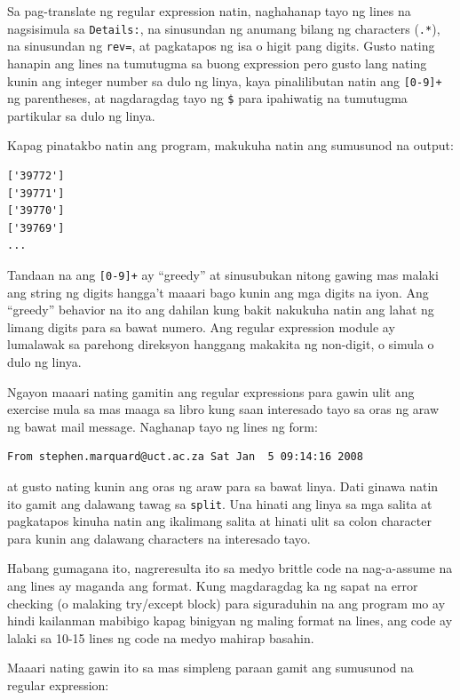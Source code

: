 \documentclass[10pt,]{book}
\begin{document}
Sa pag-translate ng regular expression natin, naghahanap tayo ng lines
na nagsisimula sa \texttt{Details:}, na sinusundan ng anumang bilang ng
characters (\texttt{.*}), na sinusundan ng \texttt{rev=}, at pagkatapos
ng isa o higit pang digits. Gusto nating hanapin ang lines na tumutugma
sa buong expression pero gusto lang nating kunin ang integer number sa
dulo ng linya, kaya pinalilibutan natin ang \texttt{{[}0-9{]}+} ng
parentheses, at nagdaragdag tayo ng \texttt{\$} para ipahiwatig na
tumutugma partikular sa dulo ng linya.

Kapag pinatakbo natin ang program, makukuha natin ang sumusunod na
output:

{\small
\begin{verbatim}
['39772']
['39771']
['39770']
['39769']
...
\end{verbatim}
}

Tandaan na ang \texttt{{[}0-9{]}+} ay ``greedy'' at sinusubukan nitong
gawing mas malaki ang string ng digits hangga't maaari bago kunin ang
mga digits na iyon. Ang ``greedy'' behavior na ito ang dahilan kung
bakit nakukuha natin ang lahat ng limang digits para sa bawat numero.
Ang regular expression module ay lumalawak sa parehong direksyon
hanggang makakita ng non-digit, o simula o dulo ng linya.

Ngayon maaari nating gamitin ang regular expressions para gawin ulit ang
exercise mula sa mas maaga sa libro kung saan interesado tayo sa oras ng
araw ng bawat mail message. Naghanap tayo ng lines ng form:

{\small
\begin{verbatim}
From stephen.marquard@uct.ac.za Sat Jan  5 09:14:16 2008
\end{verbatim}
}

at gusto nating kunin ang oras ng araw para sa bawat linya. Dati ginawa
natin ito gamit ang dalawang tawag sa \texttt{split}. Una hinati ang
linya sa mga salita at pagkatapos kinuha natin ang ikalimang salita at
hinati ulit sa colon character para kunin ang dalawang characters na
interesado tayo.

Habang gumagana ito, nagreresulta ito sa medyo brittle code na
nag-a-assume na ang lines ay maganda ang format. Kung magdaragdag ka ng
sapat na error checking (o malaking try/except block) para siguraduhin
na ang program mo ay hindi kailanman mabibigo kapag binigyan ng maling
format na lines, ang code ay lalaki sa 10-15 lines ng code na medyo
mahirap basahin.

Maaari nating gawin ito sa mas simpleng paraan gamit ang sumusunod na
regular expression:
\end{document}

